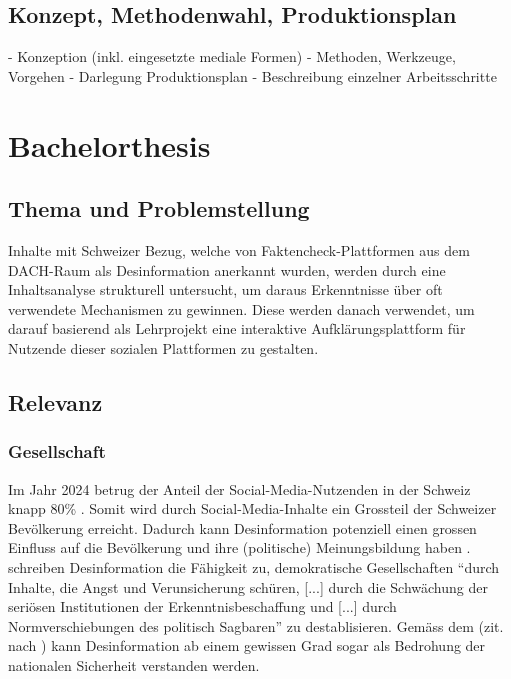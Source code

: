 \documentclass[12pt,a4paper]{article}        %
\begin{document}
\subsection{Konzept, Methodenwahl, Produktionsplan}
- Konzeption (inkl. eingesetzte mediale Formen)
- Methoden, Werkzeuge, Vorgehen
- Darlegung Produktionsplan
- Beschreibung einzelner Arbeitsschritte
\section{Bachelorthesis}
\subsection{Thema und Problemstellung}
Inhalte mit Schweizer Bezug, welche von Faktencheck-Plattformen aus dem DACH-Raum als Desinformation anerkannt wurden, werden durch eine Inhaltsanalyse strukturell untersucht, um daraus Erkenntnisse über oft verwendete Mechanismen zu gewinnen. Diese werden danach verwendet, um darauf basierend als Lehrprojekt eine interaktive Aufklärungsplattform für Nutzende dieser sozialen Plattformen zu gestalten.

\subsection{Relevanz}

\subsubsection{Gesellschaft}
Im Jahr 2024 betrug der Anteil der Social-Media-Nutzenden in der Schweiz knapp 80\% \parencite[22]{we_are_social_anteil_2024}. Somit wird durch Social-Media-Inhalte ein Grossteil der Schweizer Bevölkerung erreicht. Dadurch kann Desinformation potenziell einen grossen Einfluss auf die Bevölkerung und ihre (politische) Meinungsbildung haben \parencites[18]{grujic_warnhinweise_2024}[258]{hohlfeld_schlechte_2020}[1]{khan_fake_2021}. \\
\textcite[258]{hohlfeld_schlechte_2020} schreiben Desinformation die Fähigkeit zu, demokratische Gesellschaften “durch Inhalte, die Angst und Verunsicherung schüren, [...] durch die Schwächung der seriösen Institutionen der Erkenntnisbeschaffung und [...] durch Normverschiebungen des politisch Sagbaren” zu destablisieren. Gemäss dem \textcite{bundesministerium_des_innern_und_fur_heimat_desinformation_2022} (zit. nach \textcite[15]{teetz_social-media-post_2023}) kann Desinformation ab einem gewissen Grad sogar als Bedrohung der nationalen Sicherheit verstanden werden.
\end{document}
